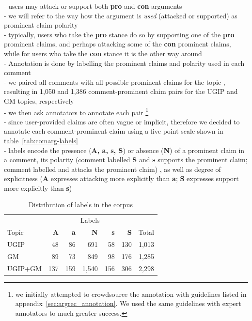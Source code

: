 \noindent - users may attack or support both \textbf{pro} and \textbf{con} arguments \\
- we will refer to the way how the argument is \textit{used} (attacked or supported)
as prominent claim polarity \\
- typically, users who take the \textbf{pro} stance do so by supporting one of the \textbf{pro}
prominent claims, and perhaps attacking some of the \textbf{con} prominent claims, while
for users who take the \textbf{con} stance it is the other way around \\


\noindent - Annotation is done by labelling the prominent claims and polarity  
used in each comment \\
- we paired all comments with all possible prominent claims for the topic , resulting in
1,050 and 1,386 comment-prominent claim pairs for the UGIP and GM topics, respectively \\
- we then ask annotators to annotate each pair
\footnote{we initially attempted to crowdsource the annotation with guidelines listed in 
appendix~\ref{sec:argrec_annotation}. We used the same guidelines with expert annotators
to much greater success.}\\
- since user-provided claims are often vague or implicit, therefore we decided to 
annotate each comment-prominent claim using a five point scale shown in 
table~\ref{tab:comarg-labels} \\
- labels encode the presence (\textbf{A, a, s, S}) or absence (\textbf{N})
of a prominent claim in a comment, its polarity
(comment labelled \textbf{S} and \textbf{s} supports the prominent claim; comment labelled
 and  attacks the prominent claim)
, as well as degree of 
explicitness (\textbf{A} expresses attacking more explicitly than \textbf{a}; \textbf{S} expresses support
more explicitly than \textbf{s}) \\

\begin{table}
\centering
{\small
\begin{tabular}{lrrrrrr}
\toprule
& \multicolumn{5}{c}{Labels}\\
\cmidrule(lr){2-6}
Topic & \textbf{A} & \textbf{a} & \textbf{N} & \textbf{s} & \textbf{S} & Total \\
\midrule
UGIP         & 48  & 86 & 691 & 58 & 130 & 1,013 \\
GM           & 89 & 73 & 849 & 98 & 176 & 1,285 \\
UGIP+GM      & 137 & 159 &1,540 & 156& 306 & 2,298 \\
\bottomrule
\end{tabular}
}
\caption{Distribution of labels in the \ComArg corpus}
\label{tab:labels}
\end{table}


